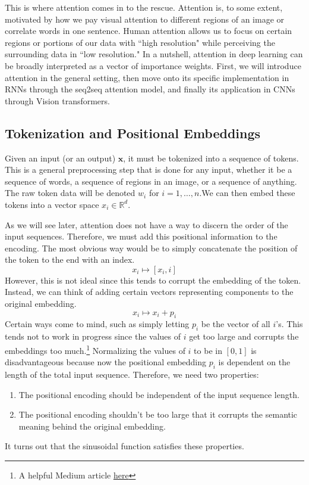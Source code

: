 \documentclass{article}
\begin{document}
  This is where attention comes in to the rescue. Attention is, to some extent, motivated by how we pay visual attention to different regions of an image or correlate words in one sentence. Human attention allows us to focus on certain regions or portions of our data with ``high resolution" while perceiving the surrounding data in ``low resolution." In a nutshell, attention in deep learning can be broadly interpreted as a vector of importance weights. First, we will introduce attention in the general setting, then move onto its specific implementation in RNNs through the seq2seq attention model, and finally its application in CNNs through Vision transformers. 

  \subsection{Tokenization and Positional Embeddings}

    Given an input (or an output) $\mathbf{x}$, it must be tokenized into a sequence of tokens. This is a general preprocessing step that is done for any input, whether it be a sequence of words, a sequence of regions in an image, or a sequence of anything. The raw token data will be denoted $w_i$ for $i = 1, \ldots, n$.We can then embed these tokens into a vector space $x_i \in \mathbb{R}^d$. 

    As we will see later, attention does not have a way to discern the order of the input sequences. Therefore, we must add this positional information to the encoding. The most obvious way would be to simply concatenate the position of the token to the end with an index. 
    \begin{equation} 
      x_i \mapsto [x_i, i]
    \end{equation}
    However, this is not ideal since this tends to corrupt the embedding of the token. Instead, we can think of adding certain vectors representing components to the original embedding. 
    \begin{equation} 
      x_i \mapsto x_i + p_i
    \end{equation}
    Certain ways come to mind, such as simply letting $p_i$ be the vector of all $i$'s. This tends not to work in progress since the values of $i$ get too large and corrupts the embeddings too much.\footnote{A helpful Medium article \href{https://medium.com/@waelrashwan/demystifying-transformer-architecture-the-magic-of-positional-encoding-5fe8154d4a64}{here}} Normalizing the values of $i$ to be in $[0, 1]$ is disadvantageous because now the positional embedding $p_i$ is dependent on the length of the total input sequence. Therefore, we need two properties: 
    \begin{enumerate} 
      \item The positional encoding should be independent of the input sequence length. 
      \item The positional encoding shouldn't be too large that it corrupts the semantic meaning behind the original embedding. 
    \end{enumerate}
    It turns out that the sinusoidal function satisfies these properties. 
\end{document}
